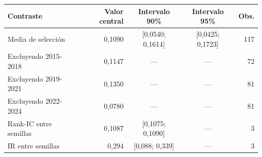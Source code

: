 \begin{tabular}{lrccr}
\toprule
Contraste & Valor central & Intervalo 90\% & Intervalo 95\% & Obs. \\
\midrule
Media de selección & 0,1090 & [0,0540; 0,1614] & [0,0425; 0,1723] & 117 \\
Excluyendo 2015-2018 & 0,1147 & — & — & 72 \\
Excluyendo 2019-2021 & 0,1350 & — & — & 81 \\
Excluyendo 2022-2024 & 0,0780 & — & — & 81 \\
Rank-IC entre semillas & 0,1087 & [0,1075; 0,1090] & — & 3 \\
IR entre semillas & 0,294 & [0,088; 0,339] & — & 3 \\
\bottomrule
\end{tabular}
